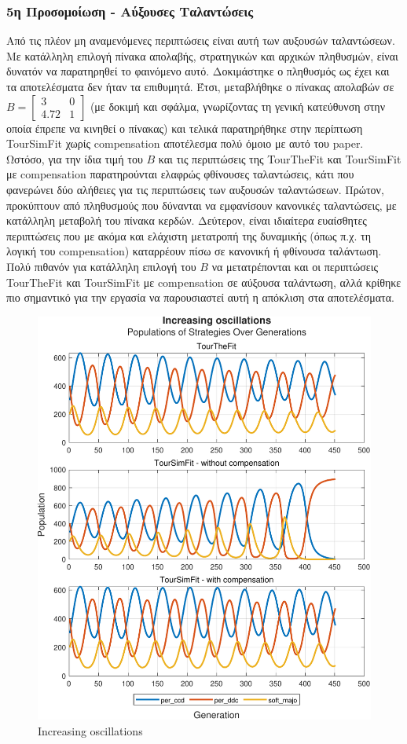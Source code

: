 \documentclass[12pt]{article}
\begin{document}
\subsubsection{5η Προσομοίωση - Αύξουσες Ταλαντώσεις}
Από τις πλέον μη αναμενόμενες περιπτώσεις είναι αυτή των αυξουσών ταλαντώσεων. Με κατάλληλη επιλογή πίνακα απολαβής, στρατηγικών και αρχικών πληθυσμών, είναι δυνατόν να παρατηρηθεί το φαινόμενο αυτό. Δοκιμάστηκε ο πληθυσμός ως έχει και τα αποτελέσματα δεν ήταν τα επιθυμητά. Έτσι, μεταβλήθηκε ο πίνακας απολαβών σε $B = \begin{bmatrix} 3 & 0 \\4.72 & 1 \end{bmatrix}$ (με δοκιμή και σφάλμα, γνωρίζοντας τη γενική κατεύθυνση στην οποία έπρεπε να κινηθεί ο πίνακας) και τελικά παρατηρήθηκε στην περίπτωση TourSimFit χωρίς compensation αποτέλεσμα πολύ όμοιο με αυτό του paper. Ωστόσο, για την ίδια τιμή του $B$ και τις περιπτώσεις της TourTheFit και TourSimFit με compensation παρατηρούνται ελαφρώς φθίνουσες ταλαντώσεις, κάτι που φανερώνει δύο αλήθειες για τις περιπτώσεις των αυξουσών ταλαντώσεων. Πρώτον, προκύπτουν από πληθυσμούς που δύνανται να εμφανίσουν κανονικές ταλαντώσεις, με κατάλληλη μεταβολή του πίνακα κερδών. Δεύτερον, είναι ιδιαίτερα ευαίσθητες περιπτώσεις που με ακόμα και ελάχιστη μετατροπή της δυναμικής (όπως π.χ. τη λογική του compensation) καταρρέουν πίσω σε κανονική ή φθίνουσα ταλάντωση. Πολύ πιθανόν για κατάλληλη επιλογή του $B$ να μετατρέπονται και οι περιπτώσεις TourTheFit και TourSimFit με compensation σε αύξουσα ταλάντωση, αλλά κρίθηκε πιο σημαντικό για την εργασία να παρουσιαστεί αυτή η απόκλιση στα αποτελέσματα.
	\begin{figure}[h]
	      \centering
	      \includegraphics[scale=0.8]{Increasing oscillations.pdf}
	      \caption{Increasing oscillations}
	\end{figure}
\end{document}
